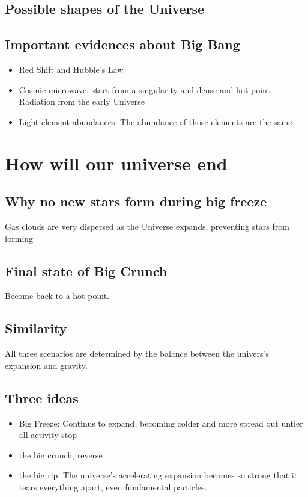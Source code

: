 \subsection{Possible shapes of the Universe}

\subsection{Important evidences about Big Bang}
\begin{itemize}
    \item Red Shift and Hubble's Law
    \item Cosmic microwave: start from a singularity and dense and hot point. Radiation from the early Universe
    \item Light element abundances: The abundance of those elements are the same
\end{itemize}

\section{How will our universe end}
\subsection{Why no new stars form during big freeze}
Gas clouds are very dispersed as the Universe expands, preventing stars from forming

\subsection{Final state of Big Crunch}
Become back to a hot point.

\subsection{Similarity}
All three scenarios are determined by the balance between the univers's expansion and gravity.

\subsection{Three ideas}
\begin{itemize}
    \item Big Freeze: Continus to expand, becoming colder and more spread out untier all activity stop
    \item the big crunch, reverse
    \item the big rip: The universe's accelerating expansion becomes so strong that it tears everything apart, even fundamental particles.
\end{itemize}

